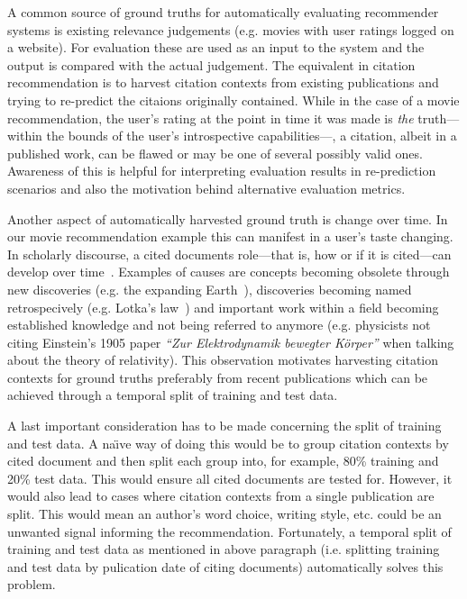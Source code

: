 
A common source of ground truths for automatically evaluating recommender systems is existing relevance judgements (e.g. movies with user ratings logged on a website). For evaluation these are used as an input to the system and the output is compared with the actual judgement. The equivalent in citation recommendation is to harvest citation contexts from existing publications and trying to re-predict the citaions originally contained. While in the case of a movie recommendation, the user's rating at the point in time it was made is \emph{the} truth---within the bounds of the user's introspective capabilities---, a citation, albeit in a published work, can be flawed or may be one of several possibly valid ones. Awareness of this is helpful for interpreting evaluation results in re-prediction scenarios and also the motivation behind alternative evaluation metrics. %

Another aspect of automatically harvested ground truth is change over time. In our movie recommendation example this can manifest in a user's taste changing. In scholarly discourse, a cited documents role---that is, how or if it is cited---can develop over time~\cite{Swales1986,He2018}. Examples of causes are concepts becoming obsolete through new discoveries (e.g. the expanding Earth~\cite{Wu2011}), discoveries becoming named retrospecively (e.g. Lotka's law~\cite{Potter1981}) and important work within a field becoming established knowledge and not being referred to anymore (e.g. physicists not citing Einstein's 1905 paper \emph{``Zur Elektrodynamik bewegter Körper''} when talking about the theory of relativity). This observation motivates harvesting citation contexts for ground truths preferably from recent publications which can be achieved through a temporal split of training and test data. %

A last important consideration has to be made concerning the split of training and test data. A na\"{\i}ve way of doing this would be to group citation contexts by cited document and then split each group into, for example, 80\% training and 20\% test data. This would ensure all cited documents are tested for. However, it would also lead to cases where citation contexts from a single publication are split. This would mean an author's word choice, writing style, etc. could be an unwanted signal informing the recommendation. Fortunately, a temporal split of training and test data as mentioned in above paragraph (i.e. splitting training and test data by pulication date of citing documents) automatically solves this problem.

